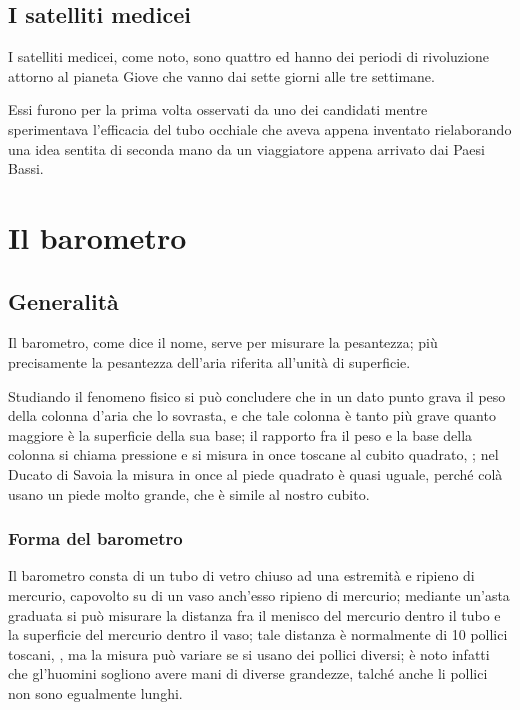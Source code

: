 \section{I satelliti medicei}
I satelliti medicei, come noto, sono quattro ed hanno dei periodi di rivoluzione
attorno al pianeta Giove che vanno dai sette giorni alle tre settimane.

Essi furono per la prima volta osservati da uno dei candidati mentre
sperimentava l'efficacia del tubo occhiale che aveva appena inventato
rielaborando una idea sentita di seconda mano da un viaggiatore appena arrivato
dai Paesi Bassi.





\chapter{Il barometro}
\section{Generalit\`a}
\begin{interlinea}{0.87} Il barometro, come dice il nome, serve per
	misurare la pesantezza; pi\`u precisamente la pesantezza dell'aria
	riferita all'unit\`a di superficie.
\end{interlinea}

\begin{interlinea}{2} Studiando il fenomeno fisico si pu\`o concludere
	che in un dato punto grava il peso della colonna d'aria che lo
	sovrasta, e che tale colonna \`e tanto pi\`u grave quanto maggiore
	\`e la superficie della sua base; il rapporto fra il peso e la base
	della colonna si chiama pressione e si misura in once toscane al cubito
	quadrato, \cite{tor1}; nel Ducato di Savoia la misura in once al piede
	quadrato \`e quasi uguale, perch\'e col\`a usano un piede molto
	grande, che \`e simile al nostro cubito.
\end{interlinea}

\subsection{Forma del barometro}
Il barometro consta di un tubo di vetro chiuso ad una estremit\`a e
ripieno di mercurio, capovolto su di un vaso anch'esso ripieno di
mercurio; mediante un'asta graduata si pu\`o misurare la distanza fra
il menisco del mercurio dentro il tubo e la superficie del mercurio
dentro il vaso; tale distanza \`e normalmente di 10 pollici toscani,
\cite{tor1,tor2}, ma la misura pu\`o variare se si usano dei pollici
diversi; \`e noto infatti che gl'huomini sogliono avere mani di
diverse grandezze, talch\'e anche li pollici non sono egualmente
lunghi.
